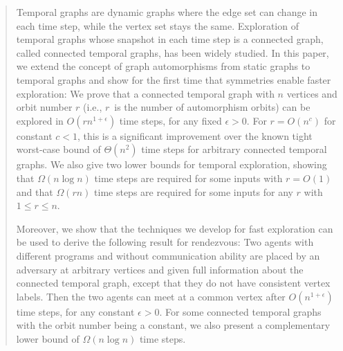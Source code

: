 \fontsize{11}{13}\selectfont


\maketitle

\begin{abstract} 
Temporal graphs are dynamic graphs where the edge set can change in each time
step, while the vertex set stays the same. Exploration of temporal graphs whose
snapshot in each time step is a connected graph, called connected temporal
graphs, has been widely studied. In this paper, we extend the concept of graph
automorphisms from static graphs to temporal graphs and show for the first
time that symmetries enable faster exploration: We prove that a connected temporal
graph with $n$ vertices and orbit number $r$ (i.e., $r$~is the number of
automorphism orbits) can be explored in $O(r n^{1+\epsilon})$ time steps, for any
fixed $\epsilon>0$. For $r=O(n^c)$ for constant $c<1$, this is a significant
improvement over the known tight worst-case bound of $\Theta(n^2)$ time steps
for arbitrary connected temporal graphs. We also give two lower bounds for
temporal exploration, showing that $\Omega(n \log n)$ time steps are required
for some inputs with $r=O(1)$ and that $\Omega(rn)$ time steps are required for
some inputs for any $r$ with $1\le r\le n$.

Moreover, we show that the techniques we develop for fast exploration can be
used to derive the following result for rendezvous: Two agents with different
programs and without communication ability are placed by an adversary at
arbitrary vertices and given full information about the connected temporal
graph, except that they do not have consistent vertex labels. Then the two
agents can meet at a common vertex after $O(n^{1+\epsilon})$ time steps, for any
constant $\epsilon>0$. For some connected temporal graphs with the orbit number
being a constant, we also present a complementary lower bound of $\Omega(n\log
n)$ time steps. 
\end{abstract}


